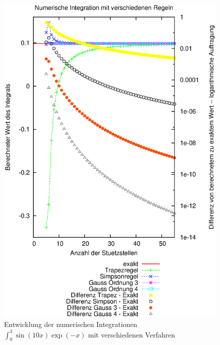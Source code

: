 \documentclass[a4paper,12pt]{article}
\begin{document}
\begin{figure}[h]
	\begin{center}
		\includegraphics[width=\textwidth]{numint03}
	\end{center}
	\caption{Entwicklung der numerischen Integrationen $\int_0^3 \sin(10 x) \exp(-x)$ mit verschiedenen Verfahren}
	\label{fig:vgl-int}
\end{figure}
\end{document}

